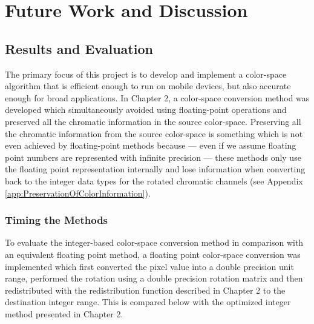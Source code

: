 
\chapter{Future Work and Discussion}

\ifpdf
    \graphicspath{{Chapter5/Figs/Raster/}{Chapter5/Figs/PDF/}{Chapter5/Figs/}}
\else
    \graphicspath{{Chapter5/Figs/Vector/}{Chapter5/Figs/}}
\fi
\section{Results and Evaluation}\label{sec:ResultsAndEvaluation}

The primary focus of this project is to develop and implement a color-space algorithm that is efficient enough to run on mobile devices, but also accurate enough for broad applications. In Chapter 2, a color-space conversion method was developed which simultaneously avoided using floating-point operations and preserved all the chromatic information in the source color-space. Preserving all the chromatic information from the source color-space is something which is not even achieved by floating-point methods because --- even if we assume floating point numbers are represented with infinite precision --- these methods only use the floating point representation internally and lose information when converting back to the integer data types for the rotated chromatic channels (see Appendix \ref{app:PreservationOfColorInformation}). 



\subsection{Timing the Methods}\label{sec:TimingTheMethods}

To evaluate the integer-based color-space conversion method in comparison with an equivalent floating point method, a floating point color-space conversion was implemented which first converted the pixel value into a double precision unit range, performed the rotation using a double precision rotation matrix and then redistributed with the redistribution function described in Chapter 2 to the destination integer range. This is compared below with the optimized integer method presented in Chapter 2.

